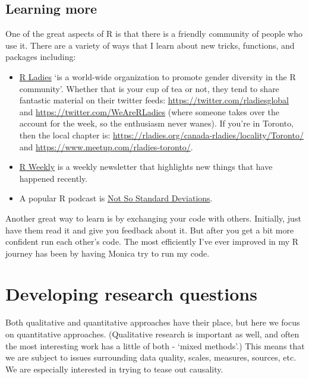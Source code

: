 \documentclass[
]{book}
\providecommand{\tightlist}{%
  \setlength{\itemsep}{0pt}\setlength{\parskip}{0pt}}
\begin{document}
\hypertarget{learning-more}{%
\subsection{Learning more}\label{learning-more}}

One of the great aspects of R is that there is a friendly community of people who use it. There are a variety of ways that I learn about new tricks, functions, and packages including:

\begin{itemize}
\tightlist
\item
  \href{https://rladies.org/}{R Ladies} `is a world-wide organization to promote gender diversity in the R community'. Whether that is your cup of tea or not, they tend to share fantastic material on their twitter feeds: \url{https://twitter.com/rladiesglobal} and \url{https://twitter.com/WeAreRLadies} (where someone takes over the account for the week, so the enthusiasm never wanes). If you're in Toronto, then the local chapter is: \url{https://rladies.org/canada-rladies/locality/Toronto/} and \url{https://www.meetup.com/rladies-toronto/}.
\item
  \href{https://rweekly.org/}{R Weekly} is a weekly newsletter that highlights new things that have happened recently.
\item
  A popular R podcast is \href{http://nssdeviations.com/}{Not So Standard Deviations}.
\end{itemize}

Another great way to learn is by exchanging your code with others. Initially, just have them read it and give you feedback about it. But after you get a bit more confident run each other's code. The most efficiently I've ever improved in my R journey has been by having Monica try to run my code.

\hypertarget{developing-research-questions}{%
\section{Developing research questions}\label{developing-research-questions}}

Both qualitative and quantitative approaches have their place, but here we focus on quantitative approaches. (Qualitative research is important as well, and often the most interesting work has a little of both - `mixed methods'.) This means that we are subject to issues surrounding data quality, scales, measures, sources, etc. We are especially interested in trying to tease out causality.
\end{document}

